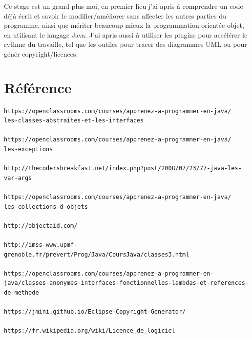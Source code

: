 \documentclass[12pt]{report}
\begin{document}
Ce stage est un grand plus moi, en premier lieu j'ai apris à comprendre un code déjà écrit et savoir le modifier/améliorer sans affecter les autres parties du programme, ainsi que mériter beaucoup mieux la programmation orientée objet, en utilisant le langage Java. J'ai apris aussi à utiliser les plugins pour accélérer le rythme du travaille, tel que les outiles pour tracer des diagrammes UML ou pour génér copyright/licences.

\newpage
\section{Référence}
\begin{verbatim}
https://openclassrooms.com/courses/apprenez-a-programmer-en-java/
les-classes-abstraites-et-les-interfaces

https://openclassrooms.com/courses/apprenez-a-programmer-en-java/
les-exceptions

http://thecodersbreakfast.net/index.php?post/2008/07/23/77-java-les-var-args

https://openclassrooms.com/courses/apprenez-a-programmer-en-java/
les-collections-d-objets

http://objectaid.com/

http://imss-www.upmf-grenoble.fr/prevert/Prog/Java/CoursJava/classes3.html

https://openclassrooms.com/courses/apprenez-a-programmer-en-java/classes-anonymes-interfaces-fonctionnelles-lambdas-et-references-de-methode

https://jmini.github.io/Eclipse-Copyright-Generator/

https://fr.wikipedia.org/wiki/Licence_de_logiciel
\end{verbatim}
\end{document}
